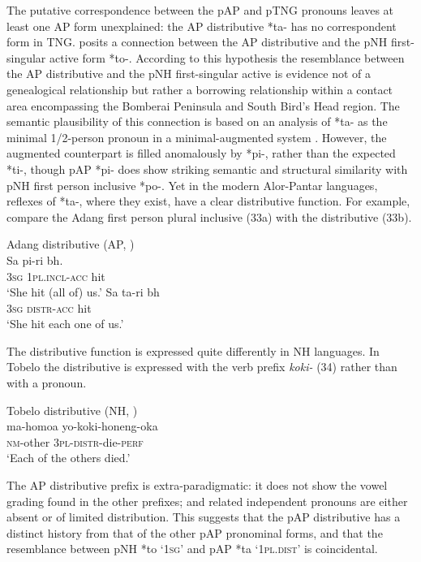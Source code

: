 The putative correspondence between the pAP and pTNG pronouns leaves at least one AP form unexplained: the AP distributive *ta- has no correspondent form in TNG. \citet{Donohue2008} posits a connection between the AP distributive and the pNH first-singular active form *to-. According to this hypothesis the resemblance between the AP distributive and the pNH first-singular active is evidence not of a genealogical relationship but rather a borrowing relationship within a contact area encompassing the Bomberai Peninsula and South Bird's Head region. The semantic plausibility of this connection is based on an analysis of *ta- as the minimal 1/2-person pronoun in a minimal-augmented system \citep{Donohue2007b}. However, the augmented counterpart is filled anomalously by *pi-, rather than the expected *ti-, though pAP *pi- does show striking semantic and structural similarity with pNH first person inclusive *po-. Yet in the modern Alor-Pantar languages, reflexes of *ta-, where they exist, have a clear distributive
function. For example, compare the Adang first person plural inclusive (33a) with the distributive (33b).


\ea%
Adang distributive (AP, \citet{Haan2001})\\
\ea
\gll Sa pi-ri b{\textepsilon}h. \\
    \textsc{3sg} \textsc{1pl.incl-acc} hit \\
\glt `She hit (all of) us.'
  \ex
  \gll Sa ta-ri b{\textepsilon}h \\
  \textsc{3sg} \textsc{distr-acc} hit \\
\glt `She hit each one of us.'
  \z
\z

The distributive function is expressed quite differently in NH languages. In Tobelo the distributive is expressed with the verb prefix \textit{koki-} (34) rather than with a pronoun.


\ea%
Tobelo distributive (NH, \citet{Holton2003})\\
\gll  ma-homoa yo-koki-honeng-oka  \\
   \textsc{nm}-other \textsc{3pl-distr}-die-\textsc{perf} \\
\glt `Each of the others died.'
\z





The AP distributive prefix is extra-paradigmatic: it does not show the vowel grading found in the other prefixes; and  related independent pronouns are either absent or of limited distribution. This suggests that the pAP distributive has a distinct history from that of the other pAP pronominal forms, and that the resemblance between pNH *to `\textsc{1sg}' and pAP *ta `\textsc{1pl.dist}' is coincidental.

